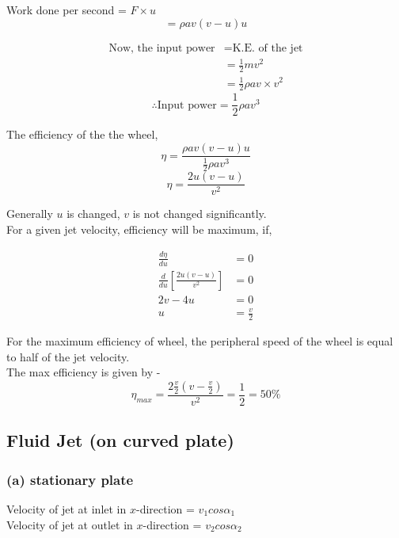 \documentclass{article}
\begin{document}
Work done per second = $F \times u$
\begin{equation}
  = \rho a v (v-u) u \label{eq:eq17}
\end{equation}

\begin{align*}
  \text{Now, the input power} &= \text{K.E. of the jet} \\
  &= \frac{1}{2} m v^2 \\
  &= \frac{1}{2} \rho a v \times v^2 
\end{align*}
\begin{equation}
  \therefore \text{Input power} = \frac{1}{2} \rho a v^3 \label{eq:eq18}
\end{equation}

The efficiency of the the wheel,
$$\eta = \frac{\rho a v (v-u) u}{\frac{1}{2} \rho a v^3}$$
\begin{equation}
  \eta = \frac{2u (v-u)}{v^2} \label{eq:eq19}
\end{equation}

\checkmark Generally $u$ is changed, $v$ is not changed significantly.\\

For a given jet velocity, efficiency will be maximum, if,


\begin{align*}
  \frac{d\eta}{du} &= 0 \\
  \frac{d}{du} \left[\frac{2u(v-u)}{v^2}\right] &= 0 \\
  2v - 4u &= 0 \\
  u &= \frac{v}{2}
\end{align*}

For the maximum efficiency of wheel, the peripheral speed of the wheel is equal to half of the jet velocity. \\

The max efficiency is given by - 
$$\eta_{max} = \frac{2 \frac{v}{2} (v - \frac{v}{2})}{v^2} = \frac{1}{2} = 50\% $$

\subsection{Fluid Jet (on curved plate)}
\subsubsection*{(a) stationary plate}

Velocity of jet at inlet in $x$-direction = $v_1 cos \alpha_1$ \\
Velocity of jet at outlet in $x$-direction = $v_2 cos \alpha_2$\\
\end{document}
